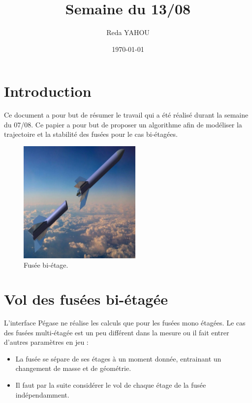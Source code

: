 \documentclass[a4paper]{article}
\title{Semaine du 13/08}
\author{Reda YAHOU}
\date{\today}
\begin{document}
\maketitle

\section*{Introduction}

Ce document a pour but de résumer le travail qui a été réalisé durant la semaine du 07/08. Ce papier a pour but de proposer un algorithme afin de modéliser la trajectoire et la stabilité des fusées pour le cas bi-étagées.\\




\begin{figure}[!htbp]
\begin{center}
\includegraphics[width=6cm]{pictures/complet-1024x494.jpg} 
\end{center}
\caption{Fusée bi-étage.}
\end{figure}





\section{Vol des fusées bi-étagée}

L'interface Pégase ne réalise les calculs que pour les fusées mono étagées. Le cas des fusées multi-étagée est un peu différent dans la mesure ou il fait entrer d'autres paramètres en jeu : \\

\begin{itemize}
\item La fusée se sépare de ses étages à un moment donnée, entrainant un changement de masse et de géométrie.
\item Il faut par la suite considérer le vol de chaque étage de la fusée indépendamment.
\end{itemize}
\end{document}
